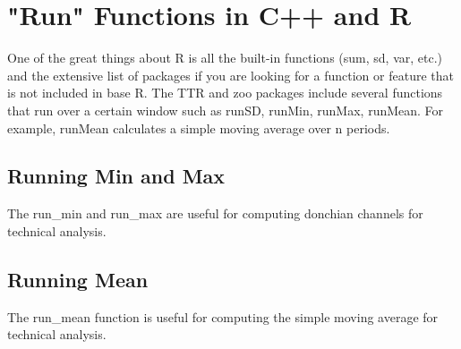 \chapter{"Run" Functions in C++ and R}
One of the great things about R is all the built-in functions (sum, sd, var, etc.) and the extensive list of packages if you are looking for a function or feature that is not included in base R. The TTR and zoo packages include several functions that run over a certain window such as runSD, runMin, runMax, runMean. For example, runMean calculates a simple moving average over n periods.

\section{Running Min and Max}
The run\_min and run\_max are useful for computing donchian channels for technical analysis.

\lstset{language=C++}


\lstset{language=C++}


\section{Running Mean}
The run\_mean function is useful for computing the simple moving average for technical analysis.

\lstset{language=C++}


